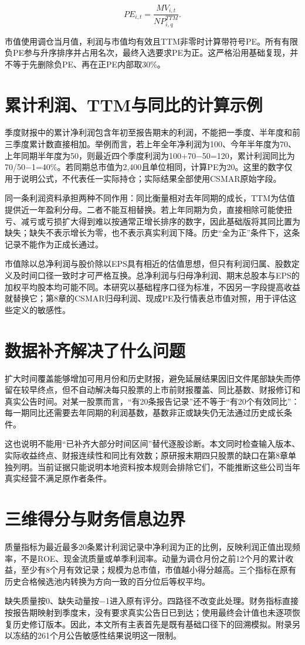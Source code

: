 \begin{equation}
PE_{i,t}=\frac{MV_{i,t}}{NP^{TTM}_{i,q}}.
\label{eq:pe}
\end{equation}

市值使用调仓当月值，利润与市值均有效且TTM非零时计算带符号PE。所有有限负PE参与升序排序并占用名次，最终入选要求PE为正。这严格沿用基础复现，并不等于先删除负PE、再在正PE内部取30\%。

\section{累计利润、TTM与同比的计算示例}
季度财报中的累计净利润包含年初至报告期末的利润，不能把一季度、半年度和前三季度累计数直接相加。举例而言，若上年全年净利润为100、今年半年度为70、上年同期半年度为50，则最近四个季度利润为100+70$-$50=120，累计利润同比为70/50$-$1=40\%。若同期总市值为2,400且单位相同，计算PE为20。这里的数字仅用于说明公式，不代表任一实际持仓；实际结果全部使用CSMAR原始字段。

同一条利润资料承担两种不同作用：同比衡量相对去年同期的成长，TTM为估值提供近一年盈利分母。二者不能互相替换。若上年同期为负，直接相除可能使扭亏、减亏或亏损扩大得到难以按通常正增长排序的数字，因此基础版将其同比置为缺失；缺失不表示增长为零，也不表示真实利润下降。历史“全为正”条件下，这条记录不能作为正成长通过。

市值除以总净利润与股价除以EPS具有相近的估值思想，但只有利润归属、股数定义及时间口径一致时才可严格互换。总净利润与归母净利润、期末总股本与EPS的加权平均股本均可能不同。本研究以基础程序口径为标准，不因另一字段提高收益就替换它；第8章的CSMAR归母利润、现成PE及行情表总市值对照，用于评估这些定义的敏感性。

\section{数据补齐解决了什么问题}
扩大时间覆盖能够增加可用月份和历史财报，避免延展结果因旧文件尾部缺失而停留在较早终点，但不自动解决每只股票的上市前财报覆盖、同比基数、财报修订和真实公告时间。对某一股票而言，“有20条报告记录”还不等于“有20个有效同比”：每一期同比还需要去年同期的利润基数，基数非正或缺失仍无法通过历史成长条件。

这也说明不能用“已补齐大部分时间区间”替代逐股诊断。本文同时检查输入版本、实际收益终点、财报连续性和同比有效数；原研报末期四只股票的缺口在第8章单独列明。当前证据只能说明本地资料按本规则会排除它们，不能推断这些公司当年真实经营不满足原作者条件。

\section{三维得分与财务信息边界}
质量指标为最近最多20条累计利润记录中净利润为正的比例，反映利润正值出现频率，不是ROE、现金流质量或单季利润率。动量为调仓月份之前12个月的累计收益，至少有8个月有效记录；规模为总市值，市值越小得分越高。三个指标在原有历史合格候选池内转换为方向一致的百分位后等权平均。

缺失质量按0、缺失动量按$-$1进入原有评分。四路径不改变此处理。财务指标直接按报告期映射到季度末，没有要求真实公告日已到达；使用最终会计值也未逐项恢复历史修订版本。因此，本文所有主表首先是既有基础口径下的回溯模拟。附录另以冻结的261个月公告敏感性结果说明这一限制。
